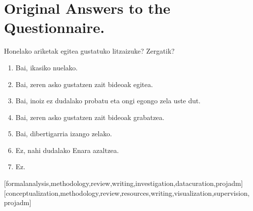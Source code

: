 \documentclass[english]{textolivre}
\begin{document}
\section{Original Answers to the Questionnaire.}\label{annex-03}

Honelako ariketak egitea gustatuko litzaizuke? Zergatik?
\begin{enumerate}
  \item Bai, ikasiko nuelako.
  \item Bai, zeren asko gustatzen zait bideoak egitea.
  \item Bai, inoiz ez dudalako probatu eta ongi egongo zela uste dut.
  \item Bai, zeren asko gustatzen zait bideoak grabatzea.
  \item Bai, dibertigarria izango zelako.
  \item Ez, nahi dudalako Enara azaltzea.
  \item Ez.
\end{enumerate}


\begin{contributors}
[formalanalysis,methodology,review,writing,investigation,datacuration,projadm]
[conceptualization,methodology,review,resources,writing,visualization,supervision,projadm]
\end{contributors}
\end{document}
